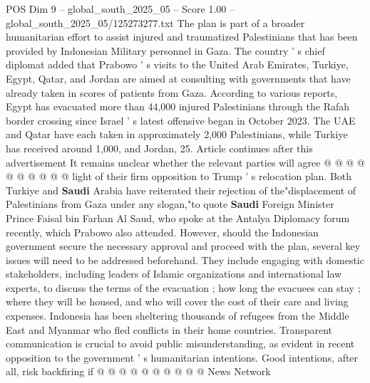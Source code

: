 \begin{textsample}{POS Dim 9 – global\_south\_2025\_05 – Score 1.00 – global\_south\_2025\_05/125273277.txt}
The plan is part of a broader humanitarian effort to assist injured and traumatized Palestinians that has been provided by Indonesian Military personnel in Gaza.
The country ' s chief diplomat added that Prabowo ' s visits to the United Arab Emirates, Turkiye, Egypt, Qatar, and Jordan are aimed at consulting with governments that have already taken in scores of patients from Gaza.
According to various reports, Egypt has evacuated more than 44,000 injured Palestinians through the Rafah border crossing since Israel ' s latest offensive began in October 2023.
The UAE and Qatar have each taken in approximately 2,000 Palestinians, while Turkiye has received around 1,000, and Jordan, 25.
Article continues after this advertisement It remains unclear whether the relevant parties will agree @ @ @ @ @ @ @ @ @ @ light of their firm opposition to Trump ' s relocation plan.
Both Turkiye and \textbf{Saudi} Arabia have reiterated their rejection of the"displacement of Palestinians from Gaza under any slogan,"to quote \textbf{Saudi} Foreign Minister Prince Faisal bin Farhan Al Saud, who spoke at the Antalya Diplomacy forum recently, which Prabowo also attended.
However, should the Indonesian government secure the necessary approval and proceed with the plan, several key issues will need to be addressed beforehand.
They include engaging with domestic stakeholders, including leaders of Islamic organizations and international law experts, to discuss the terms of the evacuation ; how long the evacuees can stay ; where they will be housed, and who will cover the cost of their care and living expenses.
Indonesia has been sheltering thousands of refugees from the Middle East and Myanmar who fled conflicts in their home countries.
Transparent communication is crucial to avoid public misunderstanding, as evident in recent opposition to the government ' s humanitarian intentions.
Good intentions, after all, risk backfiring if @ @ @ @ @ @ @ @ @ @ News Network

\end{textsample}
